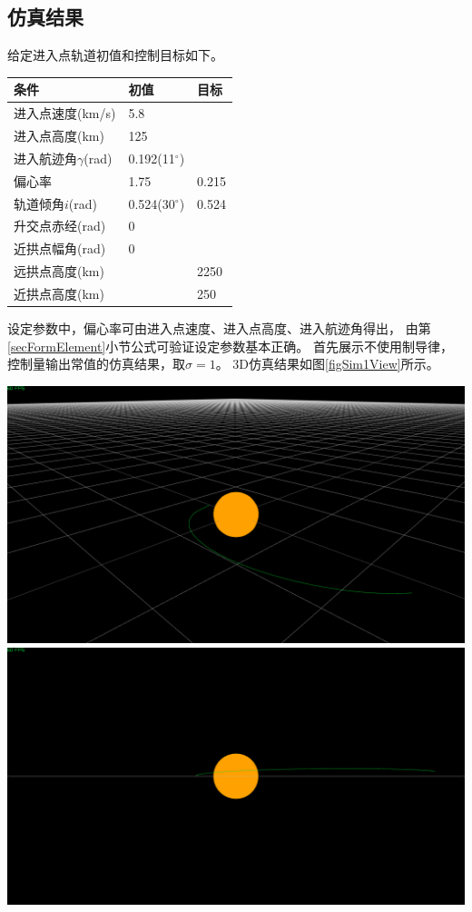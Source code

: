 \subsection{仿真结果}
给定进入点轨道初值和控制目标如下。
\begin{center}\begin{tabular}{lll}
    \toprule
    条件 & 初值 & 目标 \\
    \midrule
    进入点速度(km/s) & 5.8 \\
    进入点高度(km) & 125 \\
    进入航迹角$\gamma$(rad) & 0.192(11$^\circ$) \\
    偏心率 & 1.75 & 0.215 \\
    轨道倾角$i$(rad) & 0.524(30$^\circ$) & 0.524 \\
    升交点赤经(rad) & 0 & \\
    近拱点幅角(rad) & 0 & \\
    远拱点高度(km) & & 2250 \\
    近拱点高度(km) & & 250 \\
    \bottomrule
\end{tabular}\end{center}
设定参数中，偏心率可由进入点速度、进入点高度、进入航迹角得出，
由第\ref{secFormElement}小节公式可验证设定参数基本正确。
首先展示不使用制导律，控制量输出常值的仿真结果，取$\sigma=1$。
3D仿真结果如图\ref{figSim1View}所示。
\begin{center}
	\includegraphics[scale=0.2]{sim1Verticalview.png}  \\
	\includegraphics[scale=0.2]{sim1Sideview.png}  \\
	\label{figSim1View}
\end{center}
